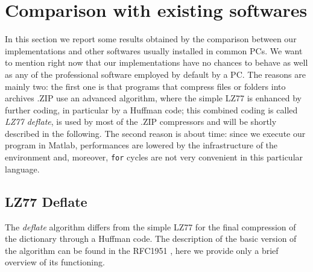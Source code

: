 \section{Comparison with existing softwares}
In this section we report some results obtained by the comparison between our implementations and other softwares usually installed in common PCs. We want to mention right now that our implementations have no chances to behave as well as any of the professional software employed by default by a PC. The reasons are mainly two: the first one is that programs that compress files or folders into archives .ZIP use an advanced algorithm, where the simple LZ77 is enhanced by further coding, in particular by a Huffman code; this combined coding is called \textit{LZ77 deflate}, is used by most of the .ZIP compressors and will be shortly described in the following. The second reason is about time: since we execute our program in Matlab, performances are lowered by the infrastructure of the environment and, moreover, \texttt{for} cycles are not very convenient in this particular language. 

\subsection{LZ77 Deflate}
The \textit{deflate} algorithm differs from the simple LZ77 for the final compression of the dictionary through a Huffman code. The description of the basic version of the algorithm can be found in the RFC1951 \cite{deut1}, here we provide only a brief overview of its functioning.
\\

